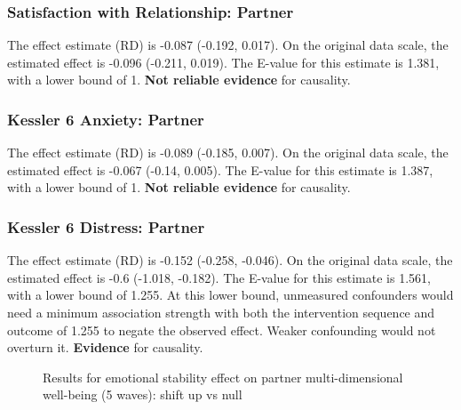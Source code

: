 \documentclass[
  singlecolumn]{article}
\begin{document}
\subsubsection{Satisfaction with Relationship:
Partner}\label{satisfaction-with-relationship-partner-13}

The effect estimate (RD) is -0.087 (-0.192, 0.017). On the original data
scale, the estimated effect is -0.096 (-0.211, 0.019). The E-value for
this estimate is 1.381, with a lower bound of 1. \textbf{Not reliable
evidence} for causality.

\subsubsection{Kessler 6 Anxiety:
Partner}\label{kessler-6-anxiety-partner-13}

The effect estimate (RD) is -0.089 (-0.185, 0.007). On the original data
scale, the estimated effect is -0.067 (-0.14, 0.005). The E-value for
this estimate is 1.387, with a lower bound of 1. \textbf{Not reliable
evidence} for causality.

\subsubsection{Kessler 6 Distress:
Partner}\label{kessler-6-distress-partner-13}

The effect estimate (RD) is -0.152 (-0.258, -0.046). On the original
data scale, the estimated effect is -0.6 (-1.018, -0.182). The E-value
for this estimate is 1.561, with a lower bound of 1.255. At this lower
bound, unmeasured confounders would need a minimum association strength
with both the intervention sequence and outcome of 1.255 to negate the
observed effect. Weaker confounding would not overturn it.
\textbf{Evidence} for causality.

\begin{figure}


\caption{\label{fig-results-emotional-stability-partner-up-long}Results
for emotional stability effect on partner multi-dimensional well-being
(5 waves): shift up vs null}

\end{figure}%

\newpage{}
\end{document}
